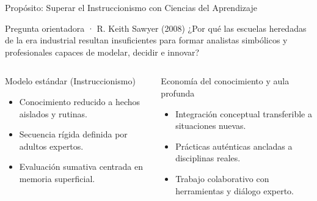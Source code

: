\documentclass[aspectratio=169,spanish,xcolor=table]{beamer}
\begin{document}
\begin{frame}{Propósito: Superar el Instruccionismo con Ciencias del Aprendizaje}
  \begin{block}{Pregunta orientadora · R. Keith Sawyer (2008)}
    ¿Por qué las escuelas heredadas de la era industrial resultan insuficientes para formar analistas simbólicos y profesionales capaces de modelar, decidir e innovar?
  \end{block}
  \vspace{0.25cm}
  \begin{columns}[T]
      \begin{block}{Modelo estándar (Instruccionismo)}
        \begin{itemize}\scriptsize
          \item Conocimiento reducido a hechos aislados y rutinas.
          \item Secuencia rígida definida por adultos expertos.
          \item Evaluación sumativa centrada en memoria superficial.
        \end{itemize}
      \end{block}
      \begin{block}{Economía del conocimiento y aula profunda}
        \begin{itemize}\scriptsize
          \item Integración conceptual transferible a situaciones nuevas.
          \item Prácticas auténticas ancladas a disciplinas reales.
          \item Trabajo colaborativo con herramientas y diálogo experto.
        \end{itemize}
      \end{block}
  \end{columns}
\end{frame}

\begin{frame}[plain]
  \centering
  \resizebox{0.97\textwidth}{!}{}
\end{frame}
\end{document}
